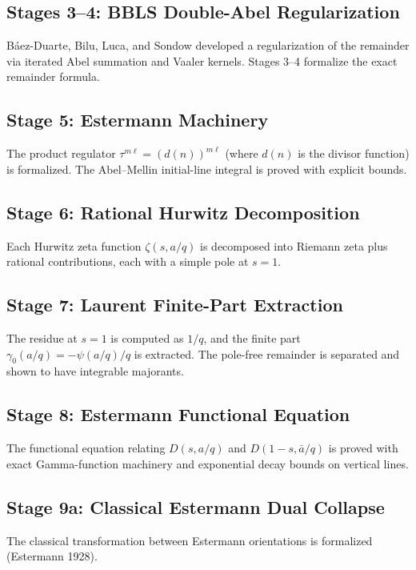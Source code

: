 \documentclass[11pt,a4paper]{article}
\theoremstyle{plain}
\theoremstyle{definition}
\theoremstyle{remark}
\begin{document}
\subsection{Stages 3--4: BBLS Double-Abel Regularization}

Báez-Duarte, Bilu, Luca, and Sondow developed a regularization of the remainder via iterated Abel summation and Vaaler kernels. Stages 3--4 formalize the exact remainder formula.

\subsection{Stage 5: Estermann Machinery}

The product regulator $\tau^{m\ell} = (d(n))^{m\ell}$ (where $d(n)$ is the divisor function) is formalized. The Abel--Mellin initial-line integral is proved with explicit bounds.

\subsection{Stage 6: Rational Hurwitz Decomposition}

Each Hurwitz zeta function $\zeta(s, a/q)$ is decomposed into Riemann zeta plus rational contributions, each with a simple pole at $s=1$.

\subsection{Stage 7: Laurent Finite-Part Extraction}

The residue at $s=1$ is computed as $1/q$, and the finite part $\gamma_0(a/q) = -\psi(a/q)/q$ is extracted. The pole-free remainder is separated and shown to have integrable majorants.

\subsection{Stage 8: Estermann Functional Equation}

The functional equation relating $D(s, a/q)$ and $D(1-s, \bar{a}/q)$ is proved with exact Gamma-function machinery and exponential decay bounds on vertical lines.

\subsection{Stage 9a: Classical Estermann Dual Collapse}

The classical transformation between Estermann orientations is formalized (Estermann 1928).
\end{document}
